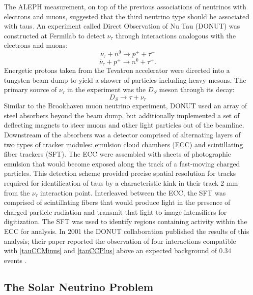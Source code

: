 The ALEPH measurement, on top of the previous associations of neutrinos with
electrons and muons, suggested that the third neutrino type should be
associated with taus.
An experiment called Direct Observation of Nu Tau (DONUT) was constructed at
Fermilab to detect $\nu_\tau$ through interactions analogous with the electrons
and muons:
\begin{equation} \label{tauCCMinus}\nu_\tau + n^0 \rightarrow  p^+ + \tau^- \end{equation}
\begin{equation} \label{tauCCPlus}\bar{\nu}_\tau + p^+ \rightarrow n^0 + \tau^+ . \end{equation}
Energetic protons taken from the Tevatron accelerator were directed into a
tungsten beam dump to yield a shower of particles including heavy mesons.  The
primary source of $\nu_\tau$ in the experiment was the $D_S$ meson through its
decay:
\begin{equation}\label{nuTauDS}
D_S \rightarrow \tau + \nu_\tau
\end{equation}
Similar to the Brookhaven muon neutrino experiment, DONUT used an array of
steel absorbers beyond the beam dump, but additionally implemented a set of
deflecting magnets to steer muons and other light particles out of the
beamline.  Downstream of the absorbers was a detector comprised of alternating
layers of two types of tracker modules: emulsion cloud chambers (ECC) and
scintillating fiber trackers (SFT).  The ECC were assembled with sheets of
photographic emulsion that would become exposed along the track of a
fast-moving charged particles.  This detection scheme provided precise spatial
resolution for tracks required for identification of taus by a characteristic
kink in their track 2 mm from the $\nu_\tau$ interaction point.  Interleaved
between the ECC, the SFT was comprised of scintillating fibers that would
produce light in the presence of charged particle radiation and transmit that
light to image intensifiers for digitization.  The SFT was used to identify
regions containing activity within the ECC for analysis.  In 2001 the DONUT
collaboration published the results of this analysis; their paper reported the
observation of four interactions compatible with \eqref{tauCCMinus} and
\eqref{tauCCPlus} above an expected background of 0.34 events  \cite{nuTau}.

\subsection{The Solar Neutrino Problem}

